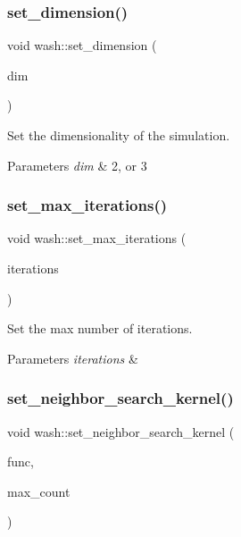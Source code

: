 \subsubsection{\texorpdfstring{set\+\_\+dimension()}{set\_dimension()}}
{\footnotesize\ttfamily void wash\+::set\+\_\+dimension (\begin{DoxyParamCaption}\item[{int}]{dim }\end{DoxyParamCaption})}



Set the dimensionality of the simulation. 


\begin{DoxyParams}{Parameters}
{\em dim} & 2, or 3 \\
\hline
\end{DoxyParams}
\mbox{\label{namespacewash_aeb7b287406244c8ab192d0524ad4da5b}} 
\subsubsection{\texorpdfstring{set\+\_\+max\+\_\+iterations()}{set\_max\_iterations()}}
{\footnotesize\ttfamily void wash\+::set\+\_\+max\+\_\+iterations (\begin{DoxyParamCaption}\item[{const uint64\+\_\+t}]{iterations }\end{DoxyParamCaption})}



Set the max number of iterations. 


\begin{DoxyParams}{Parameters}
{\em iterations} & \\
\hline
\end{DoxyParams}
\mbox{\label{namespacewash_a49d266f2bd4daa1a1de50dab5a4250df}} 
\subsubsection{\texorpdfstring{set\+\_\+neighbor\+\_\+search\+\_\+kernel()}{set\_neighbor\_search\_kernel()}}
{\footnotesize\ttfamily void wash\+::set\+\_\+neighbor\+\_\+search\+\_\+kernel (\begin{DoxyParamCaption}\item[{const Neighbors\+FuncT}]{func,  }\item[{const unsigned}]{max\+\_\+count }\end{DoxyParamCaption})}



